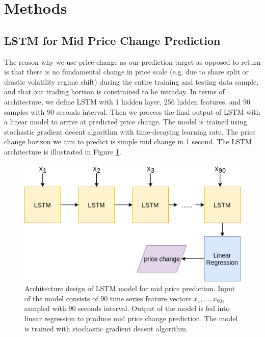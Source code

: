 \documentclass{article}
\begin{document}
\section{Methods}

\subsection{LSTM for Mid Price Change Prediction}

The reason why we use price change as our prediction target as opposed to return is that there is no fundamental change in price scale (e.g. due to share split or drastic volatility regime shift) during the entire training and testing data sample, and that our trading horizon is constrained to be intraday. In terms of architecture, we define LSTM with 1 hidden layer, 256 hidden features, and 90 samples with 90 seconds interval. Then we process the final output of LSTM with a linear model to arrive at predicted price change. The model is trained using stochastic gradient decent algorithm with time-decaying learning rate. The price change horizon we aim to predict is simple mid change in 1 second. The LSTM architecture is illustrated in Figure \ref{fig:lstm}.

\begin{figure}[h]
	\includegraphics[width=\linewidth]{lstm.png}
	\caption{Architecture design of LSTM model for mid price prediction. Input of the model consists of 90 time series feature vectors $x_1,…,x_{90}$, sampled with 90 seconds interval. Output of the model is fed into linear regression to produce mid price change prediction. The model is trained with stochastic gradient decent algorithm.}
	\label{fig:lstm}
\end{figure}
\end{document}
